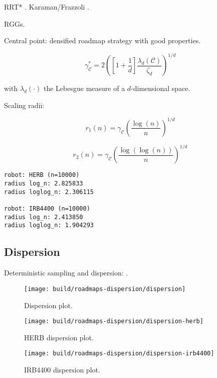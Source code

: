 RRT* \citep{karaman2010rrtstar}.
Karaman/Frazzoli \citep{karaman2011samplingoptimal}.

RGGs.

Central point: densified roadmap strategy with good properties.

\begin{equation}
   \gamma^*_{\mathcal{C}}
      = 2 \left( \left[ 1 + \frac{1}{d} \right]
         \frac{\lambda_d(\mathcal{C})}{\zeta_d} \right)^{1/d}
\end{equation}

with $\lambda_d(\cdot)$ the Lebesgue measure of a $d$-dimensional
space.

Scaling radii:

\begin{equation}
   r_1(n) = \gamma_{\mathcal{C}} \left( \frac{\log(n)}{n} \right)^{1/d}
\end{equation}

\begin{equation}
   r_2(n) = \gamma_{\mathcal{C}} \left( \frac{\log(\log(n))}{n} \right)^{1/d}
\end{equation}

\begin{verbatim}
robot: HERB (n=10000)
radius log_n: 2.825833
radius loglog_n: 2.306115

robot: IRB4400 (n=10000)
radius log_n: 2.413850
radius loglog_n: 1.904293
\end{verbatim}

\subsection{Dispersion}

Deterministic sampling and dispersion:
\citep{janson2015deterministicsampling}.

\begin{figure}
   \centering
   \texttt{[image: build/roadmaps-dispersion/dispersion]}
   \caption{Dispersion plot.}
\end{figure}

\begin{figure}
   \centering
   \texttt{[image: build/roadmaps-dispersion/dispersion-herb]}
   \caption{HERB dispersion plot.}
\end{figure}

\begin{figure}
   \centering
   \texttt{[image: build/roadmaps-dispersion/dispersion-irb4400]}
   \caption{IRB4400 dispersion plot.}
\end{figure}
